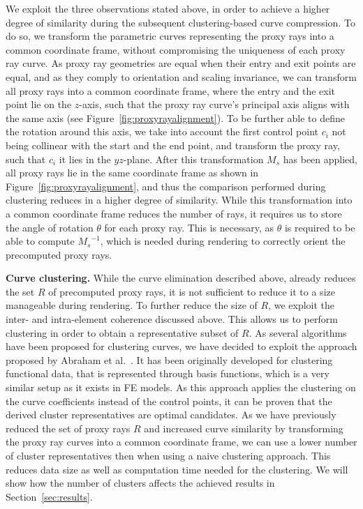 \documentclass[review,journal]{vgtc}         %
\begin{document}
We exploit the three observations stated above, in order to achieve a higher degree of similarity during the subsequent clustering-based curve compression. To do so, we transform the parametric curves representing the proxy rays into a common coordinate frame, without compromising the uniqueness of each proxy ray curve. As proxy ray geometries are equal when their entry and exit points are equal, and as they comply to orientation and scaling invariance, we can transform all proxy rays into a common coordinate frame, where the entry and the exit point lie on the $z$-axis, such that the proxy ray curve's principal axis aligns with the same axis (see Figure~\ref{fig:proxyrayalignment}). To be further able to define the rotation around this axis, we take into account the first control point $c_i$ not being collinear with the start and the end point, and transform the proxy ray, such that $c_i$ it lies in the $yz$-plane. After this transformation $M_s$ has been applied, all proxy rays lie in the same coordinate frame as shown in Figure~\ref{fig:proxyrayalignment}, and thus the comparison performed during clustering reduces in a higher degree of similarity. While this transformation into a common coordinate frame reduces the number of rays, it requires us to store the angle of rotation $\theta$ for each proxy ray. This is necessary, as $\theta$ is required to be able to compute ${M_s}^{-1}$, which is needed during rendering to correctly orient the precomputed proxy rays.

\noindent \textbf{Curve clustering.} While the curve elimination described above, already reduces the set $R$ of precomputed proxy rays, it is not sufficient to reduce it to a size manageable during rendering. To further reduce the size of $R$, we exploit the inter- and intra-element coherence discussed above. This allows us to perform clustering in order to obtain a representative subset of $R$. As several algorithms have been proposed for clustering curves, we have decided to exploit the approach proposed by Abraham et al.~\cite{abraham03clustering}. It has been originally developed for clustering functional data, that is represented through basis functions, which is a very similar setup as it exists in FE models. As this approach applies the clustering on the curve coefficients instead of the control points, it can be proven that the derived cluster representatives are optimal candidates. As we have previously reduced the set of proxy rays $R$ and increased curve similarity by transforming the proxy ray curves into a common coordinate frame, we can use a lower number of cluster representatives then when using a naive clustering approach. This reduces data size as well as computation time needed for the clustering. We will show how the number of clusters affects the achieved results in Section~\ref{sec:results}.
\end{document}
